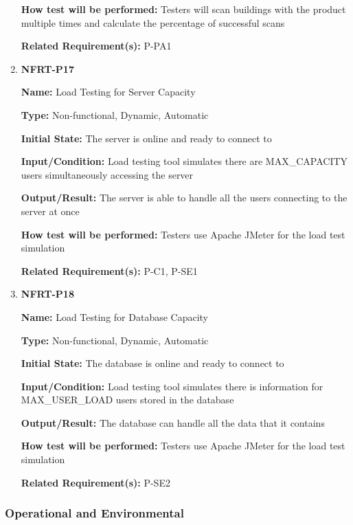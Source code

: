 \documentclass[12pt, titlepage]{article}
\begin{document}
\begin{enumerate}
\textbf{How test will be performed:} Testers will scan buildings with the product multiple times and calculate the percentage of successful scans

\textbf{Related Requirement(s):} P-PA1

\item{\textbf{NFRT-P17}}

\textbf{Name:} Load Testing for Server Capacity

\textbf{Type:} Non-functional, Dynamic, Automatic
					
\textbf{Initial State:} The server is online and ready to connect to

\textbf{Input/Condition:} Load testing tool simulates there are MAX\_CAPACITY users simultaneously accessing the server

\textbf{Output/Result:} The server is able to handle all the users connecting to the server at once

\textbf{How test will be performed:} Testers use Apache JMeter for the load test simulation

\textbf{Related Requirement(s):} P-C1, P-SE1

\item{\textbf{NFRT-P18}}

\textbf{Name:} Load Testing for Database Capacity

\textbf{Type:} Non-functional, Dynamic, Automatic
					
\textbf{Initial State:} The database is online and ready to connect to

\textbf{Input/Condition:} Load testing tool simulates there is information for MAX\_USER\_LOAD users stored in the database

\textbf{Output/Result:} The database can handle all the data that it contains

\textbf{How test will be performed:} Testers use Apache JMeter for the load test simulation

\textbf{Related Requirement(s):} P-SE2
\end{enumerate}

\subsubsection{Operational and Environmental}
\end{document}

